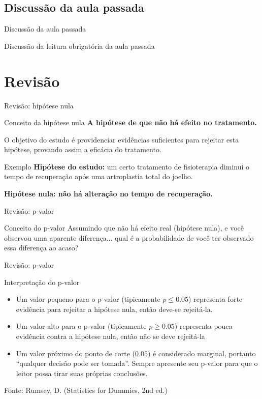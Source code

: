 \documentclass{beamer}
\begin{document}
\subsection{Discussão da aula passada}

\begin{frame}{Discussão da aula passada}
  \begin{block}{}
    Discussão da leitura obrigatória da aula passada
  \end{block}
\end{frame}

\section{Revisão}

\begin{frame}{Revisão: hipótese nula}
  \begin{block}{Conceito da hipótese nula}
    {\bf A hipótese de que não há efeito no tratamento.}

    \bigskip
    O objetivo do estudo é providenciar evidências suficientes para rejeitar esta hipótese, provando assim a eficácia do tratamento.
  \end{block}
  \begin{exampleblock}{Exemplo}
    {\bf Hipótese do estudo:} um certo tratamento de fisioterapia diminui o tempo de recuperação após uma artroplastia total do joelho.

    \bigskip
    {\bf Hipótese nula: não há alteração no tempo de recuperação.}
  \end{exampleblock}
\end{frame}

\begin{frame}{Revisão: p-valor}
  \begin{block}{Conceito do p-valor}
    Assumindo que não há efeito real (hipótese nula), e você observou uma aparente diferença... qual é a probabilidade de você ter observado essa diferença ao acaso?
  \end{block}
\end{frame}

\begin{frame}{Revisão: p-valor}
\begin{block}{Interpretação do p-valor}
  \begin{itemize}
  \item Um valor pequeno para o p-valor (tipicamente $p \le 0.05$)
    representa forte evidência para rejeitar a hipótese nula, então
    deve-se rejeitá-la.
  \item Um valor alto para o p-valor (tipicamente $p \ge 0.05$)
    representa pouca evidência contra a hipótese nula, então não se
    deve rejeitá-la
  \item Um valor próximo do ponto de corte ($0.05$) é considerado
    marginal, portanto ``qualquer decisão pode ser tomada''. Sempre
    apresente seu p-valor para que o leitor possa tirar suas próprias
    conclusões.
  \end{itemize}
\end{block}
Fonte: Rumsey, D. (Statistics for Dummies, 2nd ed.)
\end{frame}
\end{document}
